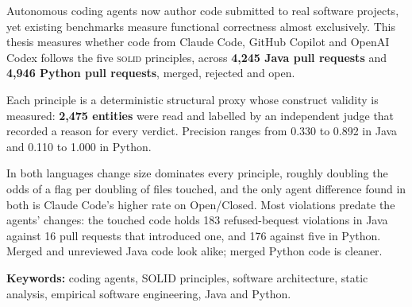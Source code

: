 \vspace{0.14cm}
\begin{center}
\end{center}
\vspace{1pt}
\noindent Autonomous coding agents now author code submitted to real software projects, yet existing
benchmarks measure functional correctness almost exclusively. This thesis measures whether code from
Claude Code, GitHub Copilot and OpenAI Codex follows the five \textsc{solid} principles, across
\textbf{4{,}245 Java pull requests} and \textbf{4{,}946 Python pull
requests}, merged, rejected and open.

Each principle is a deterministic structural proxy whose construct validity is measured:
\textbf{2{,}475 entities} were read and labelled by an independent judge that recorded a reason for
every verdict. Precision ranges from 0.330 to 0.892 in Java and 0.110 to 1.000 in Python.

In both languages change size dominates every principle, roughly doubling the odds of a flag per
doubling of files touched, and the only agent difference found in both is Claude Code's higher rate
on Open/Closed. Most violations predate the agents' changes: the touched code holds 183
refused-bequest violations in Java against 16 pull requests that introduced one, and 176 against
five in Python. Merged and unreviewed Java code look alike; merged Python code is cleaner.

\vspace{2pt}
\noindent\textbf{Keywords:} coding agents, SOLID principles, software architecture, static
analysis, empirical software engineering, Java and Python.


